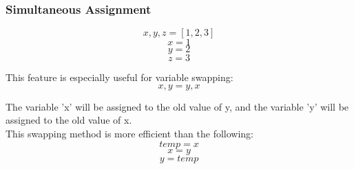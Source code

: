 \subsubsection{Simultaneous Assignment}
\[x,y,z = [1,2,3]\]
\[x = 1\]
\[y = 2\]
\[z = 3\]

This feature is especially useful for variable swapping:
\[x,y = y,x\]

The variable 'x' will be assigned to the old value of y, and the variable 'y' will be assigned to the old value of x.\\
This swapping method is more efficient than the following:
\[temp = x\]
\[x= y\]
\[y= temp\]
